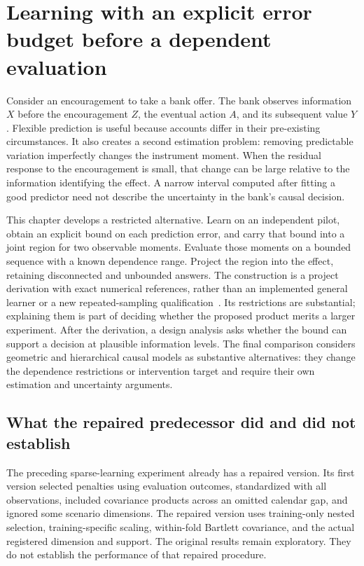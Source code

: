 \chapter{Learning with an explicit error budget before a dependent evaluation}
\label{exec13:dependent-pilot}

Consider an encouragement to take a bank offer. The bank observes information
$X$ before the encouragement $Z$, the eventual action $A$, and its subsequent
value $Y$. Flexible prediction is useful because accounts differ in their
pre-existing circumstances. It also creates a second estimation problem:
removing predictable variation imperfectly changes the instrument moment.
When the residual response to the encouragement is small, that change can be
large relative to the information identifying the effect. A narrow interval
computed after fitting a good predictor need not describe the uncertainty in
the bank's causal decision.

This chapter develops a restricted alternative. Learn on an independent pilot,
obtain an explicit bound on each prediction error, and carry that bound into
a joint region for two observable moments. Evaluate those moments on a bounded
sequence with a known dependence range. Project the region into the effect,
retaining disconnected and unbounded answers. The construction is a project
derivation with exact numerical references, rather than an implemented general
learner or a new repeated-sampling qualification~\citep{exec13_dependent_argument}.
Its restrictions are substantial; explaining them is part of deciding whether
the proposed product merits a larger experiment. After the derivation, a design analysis asks whether the bound can support a decision at plausible information levels. The final comparison considers geometric and hierarchical causal models as substantive alternatives: they change the dependence restrictions or intervention target and require their own estimation and uncertainty arguments.

\section{What the repaired predecessor did and did not establish}

The preceding sparse-learning experiment already has a repaired version. Its
first version selected penalties using evaluation outcomes, standardized with
all observations, included covariance products across an omitted calendar gap,
and ignored some scenario dimensions. The repaired version uses training-only
nested selection, training-specific scaling, within-fold Bartlett covariance,
and the actual registered dimension and support. The original results remain
exploratory. They do not establish the performance of that repaired procedure.

